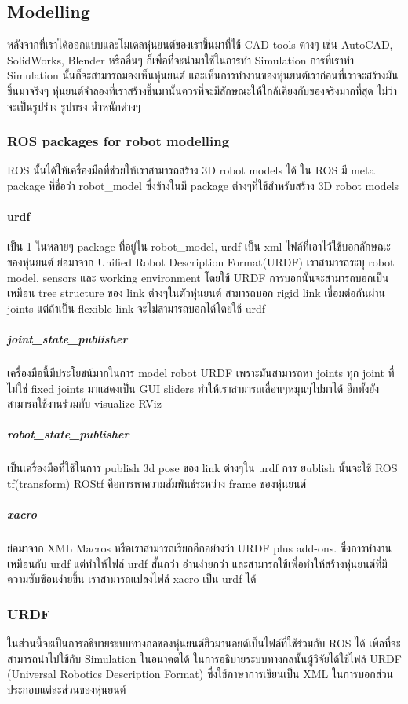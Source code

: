 \subsection{Modelling}
หลังจากที่เราได้ออกแบบและโมเดลหุ่นยนต์ของเราขึ้นมาที่ใช้ CAD tools ต่างๆ เช่น AutoCAD, SolidWorks, Blender
หรืออื่นๆ ก็เพื่อที่จะนำมาใช้ในการทำ Simulation การที่เราทำ Simulation นั้นก็จะสามารถมองเห็นหุ่นยนต์
และเห็นการทำงานของหุ่นยนต์เราก่อนที่เราจะสร้างมันขึ้นมาจริงๆ หุ่นยนต์จำลองที่เราสร้างขึ้นมานั้นควรที่จะมีลักษณะให้ใกล้เคียงกับของจริงมากที่สุด
ไม่ว่าจะเป็นรูปร่าง รูปทรง น้ำหนักต่างๆ 

\subsubsection{ROS packages for robot modelling}
ROS นั้นได้ให้เครื่องมือที่ช่วยให้เราสามารถสร้าง 3D robot models ได้
ใน ROS มี meta package ที่ชื่อว่า robot\_model ซึ่งข้างในมี package ต่างๆที่ใช้สำหรับสร้าง 3D robot models
        
\paragraph*{urdf}
เป็น 1 ในหลายๆ package ที่อยู่ใน robot\_model, urdf เป็น xml ไฟล์ที่เอาไว้ใช้บอกลักษณะของหุ่นยนต์ ย่อมาจาก Unified Robot Description Format(URDF)
เราสามารถระบุ robot model, sensors และ working environment โดยใช้ URDF การบอกนั้นจะสามารถบอกเป็นเหมือน tree structure ของ link ต่างๆในตัวหุ่นยนต์ สามารถบอก rigid link เชื่อมต่อกันผ่าน joints แต่ถ้าเป็น flexible link จะไม่สามารถบอกได้โดยใช้ urdf

\subparagraph*{joint\_state\_publisher}
เครื่องมือนี้มีประโยชน์มากในการ model robot URDF เพราะมันสามารถหา joints ทุก joint ที่ไม่ใช่ fixed joints มาแสดงเป็น GUI sliders ทำให้เราสามารถเลื่อนๆหมุนๆไปมาได้ อีกทั้งยังสามารถใช้งานร่วมกับ visualize RViz

\subparagraph*{robot\_state\_publisher}
เป็นเครื่องมือที่ใช้ในการ publish 3d pose ของ link ต่างๆใน urdf การ ยublish นั้นจะใช้ ROS tf(transform) ROStf คือการหาความสัมพันธ์ระหว่าง frame ของหุ่นยนต์

\subparagraph*{xacro}
ย่อมาจาก XML Macros หรือเราสามารถเรียกอีกอย่างว่า URDF plus add-ons. ซึ่งการทำงานเหมือนกับ urdf แต่ทำให้ไฟล์ urdf สั้นกว่า อ่านง่ายกว่า และสามารถใช้เพื่อทำให้สร้างหุ่นยนต์ที่มีความซับซ้อนง่ายขึ้น เราสามารถแปลงไฟล์ xacro เป็น urdf ได้

\subsubsection{URDF}
ในส่วนนี้จะเป็นการอธิบายระบบทางกลของหุ่นยนต์ฮิวมานอยด์เป็นไฟล์ที่ใช้ร่วมกับ ROS ได้ เพื่อที่จะสามารถนำไปใช้กับ Simulation ในอนาคตได้
ในการอธิบายระบบทางกลนั้นผู้วิจัยได้ใช้ไฟล์ URDF (Universal Robotics Description Format) ซึ่งใช้ภาษาการเขียนเป็น XML ในการบอกส่วนประกอบแต่ละส่วนของหุ่นยนต์

